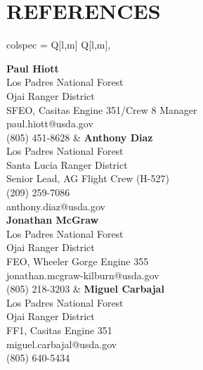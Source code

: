 \documentclass[a4paper,9pt]{extarticle}
\begin{document}
\section*{REFERENCES}

\begin{center}
\begin{tblr}{
    colspec = {Q[l,m] Q[l,m]},
}

{\textbf{Paul Hiott} \\
Los Padres National Forest \\
Ojai Ranger District \\
SFEO, Casitas Engine 351/Crew 8 Manager \\
paul.hiott@usda.gov \\
(805) 451-8628}
&
{\textbf{Anthony Diaz} \\
Los Padres National Forest \\
Santa Lucia Ranger District \\
Senior Lead, AG Flight Crew (H-527) \\
(209) 259-7086 \\
anthony.diaz@usda.gov} \\

{\textbf{Jonathan McGraw} \\
Los Padres National Forest \\
Ojai Ranger District \\
FEO, Wheeler Gorge Engine 355 \\
jonathan.mcgraw-kilburn@usda.gov \\
(805) 218-3203}
&
{\textbf{Miguel Carbajal} \\
Los Padres National Forest \\
Ojai Ranger District \\
FF1, Casitas Engine 351 \\
miguel.carbajal@usda.gov \\
(805) 640-5434}

\end{tblr}
\end{center}
\end{document}
